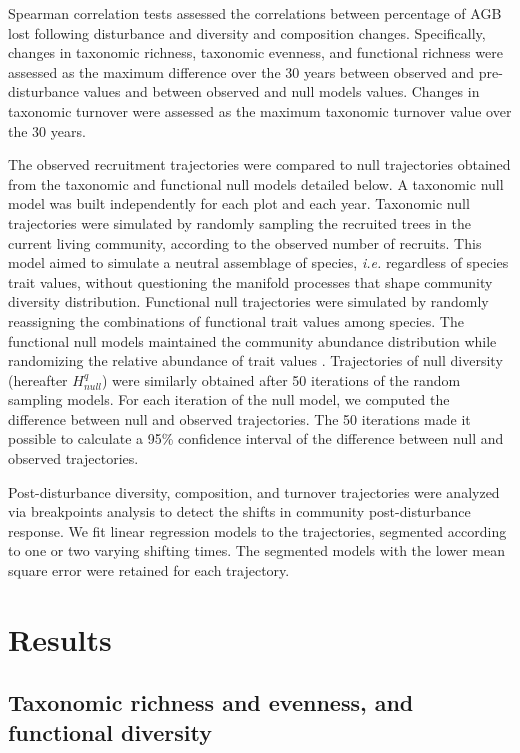 \documentclass[fleqn,10pt]{ArtEcoFoG} %
\begin{document}
Spearman correlation tests assessed the correlations between percentage of AGB lost following disturbance and diversity and composition changes. Specifically, changes in taxonomic richness, taxonomic evenness, and functional richness were assessed as the maximum difference over the 30 years between observed and pre-disturbance values and between observed and null models values. Changes in taxonomic turnover were assessed as the maximum taxonomic turnover value over the 30 years.

The observed recruitment trajectories were compared to null trajectories obtained from the taxonomic and functional null models detailed below. A taxonomic null model was built independently for each plot and each year. Taxonomic null trajectories were simulated by randomly sampling the recruited trees in the current living community, according to the observed number of recruits. This model aimed to simulate a neutral assemblage of species, \emph{i.e.} regardless of species trait values, without questioning the manifold processes that shape community diversity distribution. Functional null trajectories were simulated by randomly reassigning the combinations of functional trait values among species. The functional null models maintained the community abundance distribution while randomizing the relative abundance of trait values \citep{Mason2013}.
Trajectories of null diversity (hereafter \(H^q_{null}\)) were similarly obtained after 50 iterations of the random sampling models.
For each iteration of the null model, we computed the difference between null and observed trajectories. The 50 iterations made it possible to calculate a 95\% confidence interval of the difference between null and observed trajectories.

Post-disturbance diversity, composition, and turnover trajectories were analyzed via breakpoints analysis to detect the shifts in community post-disturbance response. We fit linear regression models to the trajectories, segmented according to one or two varying shifting times. The segmented models with the lower mean square error were retained for each trajectory.

\hypertarget{results}{%
\section{Results}\label{results}}

\hypertarget{taxonomic-richness-and-evenness-and-functional-diversity}{%
\subsection{Taxonomic richness and evenness, and functional diversity}\label{taxonomic-richness-and-evenness-and-functional-diversity}}
\end{document}
